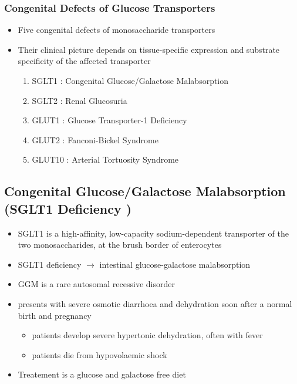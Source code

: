 \documentclass{scrartcl}
\begin{document}
\subsubsection{Congenital Defects of Glucose Transporters}
\label{sec:org38ef7ce}
\begin{itemize}
\item Five congenital defects of monosaccharide transporters
\item Their clinical picture depends on tissue-specific expression and
substrate specificity of the affected transporter

\begin{enumerate}
\item SGLT1 : Congenital Glucose/Galactose Malabsorption
\item SGLT2 : Renal Glucosuria
\item GLUT1 : Glucose Transporter-1 Deficiency
\item GLUT2 : Fanconi-Bickel Syndrome
\item GLUT10 : Arterial Tortuosity Syndrome
\end{enumerate}
\end{itemize}

\subsection{Congenital Glucose/Galactose Malabsorption (SGLT1 Deficiency )}
\label{sec:org5af71ae}

\begin{itemize}
\item SGLT1 is a high-affinity, low-capacity sodium-dependent transporter
of the two monosaccharides, at the brush border of enterocytes

\item SGLT1 deficiency \(\to\) intestinal glucose-galactose malabsorption
\item GGM is a rare autosomal recessive disorder

\item presents with severe osmotic diarrhoea and dehydration soon after a
normal birth and pregnancy
\begin{itemize}
\item patients develop severe hypertonic dehydration, often with fever
\item patients die from hypovolaemic shock
\end{itemize}

\item Treatement is a glucose and galactose free diet
\end{itemize}
\end{document}
